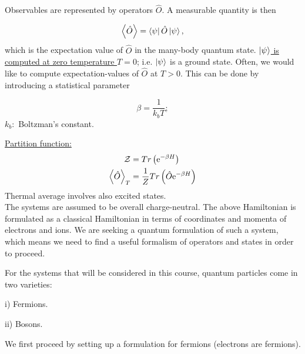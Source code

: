 \noindent Observables are represented by operators $\hat{O}$. A measurable quantity is then 

\begin{equation}
	\expval{\hat{O}} = \bra{\psi} \hat{O} \ket{\psi},
\end{equation}
which is the expectation value of $\hat{O}$ in the many-body quantum state. \uline{$\ket{\psi}$ is computed at zero temperature $T=0$}; i.e. $\ket{\psi}$ is a ground state. Often, we would like to compute expectation-values of $\hat{O}$ at $T>0$. This can be done by introducing a statistical parameter 

\begin{equation}
	\beta = \frac{1}{k_b T};
\end{equation}
$k_b:$ Boltzman's constant.\\
\linebreak

\noindent \uline{Partition function:}
\begin{align}
	\mathcal{Z} &= Tr \left(\mathrm{e}^{-\beta H} \right)\\
	\expval{\hat{O}}_T &= \frac{1}{Z} Tr \left(\hat{O} \mathrm{e}^{-\beta H} \right)
\end{align}
Thermal average involves also excited states.\\
\linebreak
\noindent The systems are assumed to be overall charge-neutral. 
The above Hamiltonian is formulated as a classical Hamiltonian in terms of coordinates and momenta of electrons and ions.
We are seeking a quantum formulation of such a system, which means we need to find a useful formalism of operators and states in order to proceed.\\
\linebreak

\noindent For the systems that will be considered in this course, quantum particles come in two varieties:

i) Fermions.

ii) Bosons.

\noindent We first proceed by setting up a formulation for fermions (electrons are fermions).

























